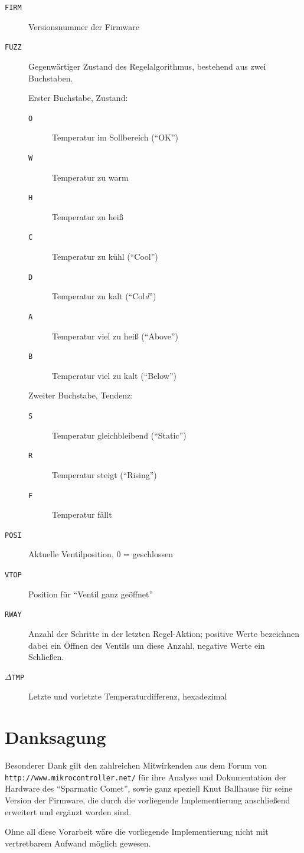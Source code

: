 \documentclass[a5paper,twoside]{article}
\newcommand\SC{"`Sparmatic Comet"'}
\begin{document}
\begin{description}
\item[\texttt{FIRM}] Versionsnummer der Firmware
\item[\texttt{FUZZ}] Gegenwärtiger Zustand des Regelalgorithmus,
  bestehend aus zwei Buchstaben.

  Erster Buchstabe, Zustand:
  \begin{description}
  \item[\texttt{O}] Temperatur im Sollbereich ("`OK"')
  \item[\texttt{W}] Temperatur zu warm
  \item[\texttt{H}] Temperatur zu heiß
  \item[\texttt{C}] Temperatur zu kühl ("`Cool"')
  \item[\texttt{D}] Temperatur zu kalt ("`Col\emph{d}"')
  \item[\texttt{A}] Temperatur viel zu heiß ("`Above"')
  \item[\texttt{B}] Temperatur viel zu kalt ("`Below"')
  \end{description}

  Zweiter Buchstabe, Tendenz:
  \begin{description}
  \item[\texttt{S}] Temperatur gleichbleibend ("`Static"')
  \item[\texttt{R}] Temperatur steigt ("`Rising"')
  \item[\texttt{F}] Temperatur fällt
  \end{description}
\item[\texttt{POSI}] Aktuelle Ventilposition, 0 = geschlossen\label{menu:dbg-posi}
\item[\texttt{VTOP}] Position für "`Ventil ganz geöffnet"'
\item[\texttt{RWAY}] Anzahl der Schritte in der letzten Regel-Aktion; positive
  Werte bezeichnen dabei ein Öffnen des Ventils um diese Anzahl, negative
  Werte ein Schließen.
\item[\texttt{$\Delta$TMP}] Letzte und vorletzte Temperaturdifferenz, hexadezimal
\end{description}

\section {
  Danksagung
}

Besonderer Dank gilt den zahlreichen Mitwirkenden aus dem Forum von
\texttt{http://www.mikrocontroller.net/} für ihre Analyse und
Dokumentation der Hardware des \SC, sowie ganz speziell Knut Ballhause
für seine Version der Firmware, die durch die vorliegende
Implementierung anschließend erweitert und ergänzt worden sind.

Ohne all diese Vorarbeit wäre die vorliegende Implementierung nicht
mit vertretbarem Aufwand möglich gewesen.
\end{document}
